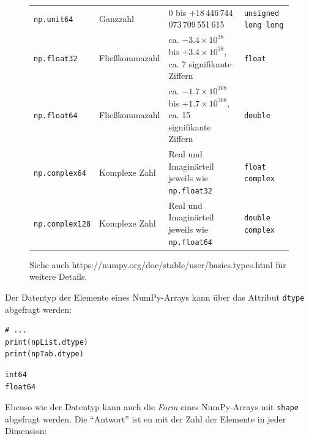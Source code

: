 \begin{figure}[h]
\begin{tcolorbox}[title=Übliche NumPy-Datentypen]
\begin{center}
\begin{tabular}{lm{.15\linewidth}m{.3\linewidth}m{.25\linewidth}}
	\texttt{np.unit64}     & Ganzzahl & 0 bis +18\,446\,744\,073\,709\,551\,615                                                  & \texttt{unsigned long long}\\
	\texttt{np.float32}    & Fließkommazahl & ca. $-3.4 \times 10^{38}$ bis $+3.4 \times 10^{38}$, ca. 7 signifikante Ziffern    & \texttt{float} \\
	\texttt{np.float64}    & Fließkommazahl & ca. $-1.7 \times 10^{308}$ bis $+1.7 \times 10^{308}$, ca. 15 signifikante Ziffern & \texttt{double}\\
	\texttt{np.complex64}  & Komplexe Zahl & Real und Imaginärteil jeweils wie \texttt{np.float32}                               & \texttt{float complex} \\
	\texttt{np.complex128} & Komplexe Zahl & Real und Imaginärteil jeweils wie \texttt{np.float64}                               & \texttt{double complex}  \\
\end{tabular}
\label{tab:NumPyDataTypes}
Siehe auch {https://numpy.org/doc/stable/user/basics.types.html} für weitere Details.
\end{center}
\end{tcolorbox}
\end{figure}

Der Datentyp der Elemente eines NumPy-Arrays kann über das Attribut \texttt{dtype} abgefragt werden:
\begin{tcbraster}[raster columns=2,
                  raster equal height,
                  nobeforeafter,
                  raster column skip=0.5cm]
\begin{codebox}
\begin{verbatim}
# ...
print(npList.dtype)
print(npTab.dtype)
\end{verbatim}
\end{codebox}
%
\begin{cmdbox}
\begin{verbatim}
int64
float64
\end{verbatim}
\end{cmdbox}
\end{tcbraster}

Ebenso wie der Datentyp kann auch die \emph{Form} eines NumPy-Arrays mit \texttt{shape} abgefragt werden. Die \enquote{Antwort} ist en  mit der Zahl der Elemente in jeder Dimension:

